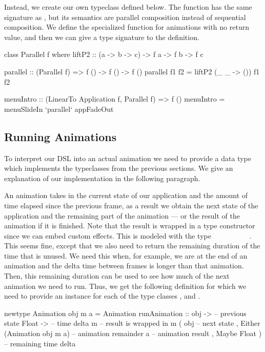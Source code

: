 Instead, we create our own  typeclass defined below. The function  has the same signature as , but its semantics are parallel composition instead of sequential composition. We define the specialized  function for animations with no return value, and then we can give a type signature to the  definition.

\begin{code}
class Parallel f where
  liftP2 :: (a -> b -> c) -> f a -> f b -> f c

parallel :: (Parallel f) => f () -> f () -> f ()
parallel f1 f2 = liftP2 (\_ _ -> ()) f1 f2

menuIntro :: (LinearTo Application f, Parallel f) => f ()
menuIntro = menuSlideIn `parallel` appFadeOut
\end{code}

\subsection{Running Animations}

To interpret our DSL into an actual animation we need to provide a data type which implements the typeclasses from the previous sections. We give an explanation of our implementation in the following paragraph.

An animation takes in the current state of our application and the amount of time elapsed since the previous frame, as a result we obtain the next state of the application and the remaining part of the animation --- or the result of the animation if it is finished. Note that the result is wrapped in a type constructor  since we can embed custom effects. This is modeled with the type ~\hs{->}~~\hs{->}~~~~~~~. This seems fine, except that we also need to return the remaining duration of the time that is unused. We need this when, for example, we are at the end of an animation and the delta time between frames is longer than that animation. Then, this remaining duration can be used to see how much of the next animation we need to run. Thus, we get the following definition for which we need to provide an instance for each of the type classes ,  and .

\begin{code}
newtype Animation obj m a = Animation { runAnimation ::
    obj ->                    -- previous state
    Float ->                  -- time delta
    m                         -- result is wrapped in m
      ( obj                   -- next state
      , Either
          (Animation obj m a) -- animation remainder
          a                   -- animation result
      , Maybe Float )}        -- remaining time delta
\end{code}

